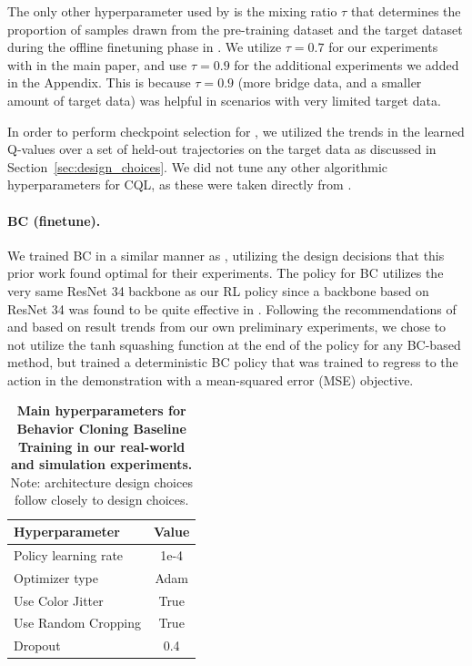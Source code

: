 \documentclass[../thesis.tex]{subfiles}
\begin{document}
The only other hyperparameter used by \ptrmethodname is the mixing ratio $\tau$ that determines the proportion of samples drawn from the pre-training dataset and the target dataset during the offline finetuning phase in \ptrmethodname. We utilize $\tau = 0.7$ for our experiments with \ptrmethodname in the main paper, and use $\tau = 0.9$ for the additional experiments we added in the Appendix. This is because $\tau=0.9$ (more bridge data, and a smaller amount of target data) was helpful in scenarios with very limited target data.  

In order to perform checkpoint selection for \ptrmethodname, we utilized the trends in the learned Q-values over a set of held-out trajectories on the target data as discussed in Section~\ref{sec:design_choices}. We did not tune any other algorithmic hyperparameters for CQL, as these were taken directly from \citep{singh2020cog}.  

\paragraph{BC (finetune).}
We trained BC in a similar manner as \citet{ebert2021bridge}, utilizing the design decisions that this prior work found optimal for their experiments. The policy for BC utilizes the very same ResNet 34 backbone as our RL policy since a backbone based on ResNet 34 was found to be quite effective in \citet{ebert2021bridge}. Following the recommendations of \citet{ebert2021bridge} and based on result trends from our own preliminary experiments, we chose to not utilize the tanh squashing function at the end of the policy for any BC-based method, but trained a deterministic BC policy that was trained to regress to the action in the demonstration with a mean-squared error (MSE) objective. 

\begin{table}[h]
\centering
\begin{tabular}{l|c}
\toprule
\textbf{Hyperparameter} & \textbf{Value}\\  \midrule
Policy learning rate & 1e-4 \\
Optimizer type & Adam \\
Use Color Jitter & True \\
Use Random Cropping & True \\
Dropout & 0.4 \\
\bottomrule
\end{tabular}
\vspace{0.07cm}
\caption{\footnotesize{\textbf{Main hyperparameters for Behavior Cloning Baseline Training in our real-world and simulation experiments.} Note: architecture design choices follow closely to \ptrmethodname design choices.}}
\label{tab:hparams_cql}
\vspace{-0.4cm}
\end{table}
\end{document}
